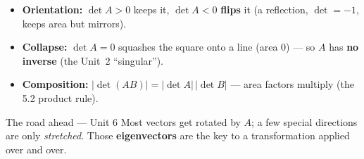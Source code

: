 \documentclass[aspectratio=169, 11pt]{beamer}
\begin{document}
\begin{frame}[t, plain]
  \begin{itemize}
    \setlength{\itemsep}{5pt}
    \item \textbf{Orientation:} $\det A>0$ keeps it, $\det A<0$ \textbf{flips} it (a reflection, $\det=-1$,
          keeps area but mirrors).
    \item \textbf{Collapse:} $\det A=0$ squashes the square onto a line (area $0$) --- so $A$ has \textbf{no
          inverse} (the Unit~2 ``singular'').
    \item \textbf{Composition:} $|\det(AB)|=|\det A|\,|\det B|$ --- area factors multiply (the 5.2 product rule).
  \end{itemize}
  \vspace{2pt}
  \begin{block}{The road ahead --- Unit 6}
    Most vectors get rotated by $A$; a few special directions are only \emph{stretched}. Those
    \textbf{eigenvectors} are the key to a transformation applied over and over.
  \end{block}
\end{frame}
\end{document}
